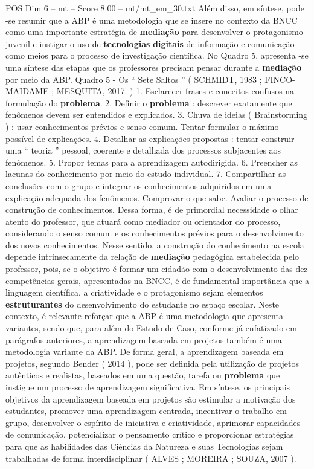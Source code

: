 \begin{textsample}{POS Dim 6 – mt – Score 8.00 – mt/mt\_em\_30.txt}
Além disso, em síntese, pode -se resumir que a ABP é uma metodologia que se insere no contexto da BNCC como uma importante estratégia de \textbf{mediação} para desenvolver o protagonismo juvenil e instigar o uso de \textbf{tecnologias} \textbf{digitais} de informação e comunicação como meios para o processo de investigação científica.
No Quadro 5, apresenta -se uma síntese das etapas que os professores precisam pensar durante a \textbf{mediação} por meio da ABP.
Quadro 5 - Os “ Sete Saltos ” ( SCHMIDT, 1983 ; FINCO-MAIDAME ; MESQUITA, 2017. ) 1.
Esclarecer frases e conceitos confusos na formulação do \textbf{problema}. 2.
Definir o \textbf{problema} : descrever exatamente que fenômenos devem ser entendidos e explicados. 3.
Chuva de ideias ( Brainstorming ) : usar conhecimentos prévios e senso comum.
Tentar formular o máximo possível de explicações. 4.
Detalhar as explicações propostas : tentar construir uma “ teoria ” pessoal, coerente e detalhada dos processos subjacentes aos fenômenos. 5.
Propor temas para a aprendizagem autodirigida. 6.
Preencher as lacunas do conhecimento por meio do estudo individual. 7.
Compartilhar as conclusões com o grupo e integrar os conhecimentos adquiridos em uma explicação adequada dos fenômenos.
Comprovar o que sabe.
Avaliar o processo de construção de conhecimentos.
Dessa forma, é de primordial necessidade o olhar atento do professor, que atuará como mediador ou orientador do processo, considerando o senso comum e os conhecimentos prévios para o desenvolvimento dos novos conhecimentos.
Nesse sentido, a construção do conhecimento na escola depende intrinsecamente da relação de \textbf{mediação} pedagógica estabelecida pelo professor, pois, se o objetivo é formar um cidadão com o desenvolvimento das dez competências gerais, apresentadas na BNCC, é de fundamental importância que a linguagem científica, a criatividade e o protagonismo sejam elementos \textbf{estruturantes} do desenvolvimento do estudante no espaço escolar.
Neste contexto, é relevante reforçar que a ABP é uma metodologia que apresenta variantes, sendo que, para além do Estudo de Caso, conforme já enfatizado em parágrafos anteriores, a aprendizagem baseada em projetos também é uma metodologia variante da ABP.
De forma geral, a aprendizagem baseada em projetos, segundo Bender ( 2014 ), pode ser definida pela utilização de projetos autênticos e realistas, baseados em uma questão, tarefa ou \textbf{problema} que instigue um processo de aprendizagem significativa.
Em síntese, os principais objetivos da aprendizagem baseada em projetos são estimular a motivação dos estudantes, promover uma aprendizagem centrada, incentivar o trabalho em grupo, desenvolver o espírito de iniciativa e criatividade, aprimorar capacidades de comunicação, potencializar o pensamento crítico e proporcionar estratégias para que as habilidades das Ciências da Natureza e suas Tecnologias sejam trabalhadas de forma interdisciplinar ( ALVES ; MOREIRA ; SOUZA, 2007 ).

\end{textsample}
